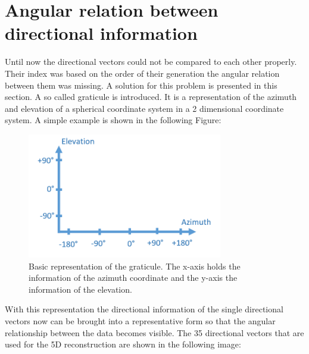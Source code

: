\section{Angular relation between directional information}
\label{angular_directional_relation}


Until now the directional vectors could not be compared to each other properly. Their index was based on the order of their generation the angular relation between them was missing. A solution for this problem is presented in this section. A so called graticule is introduced. It is a representation of the azimuth and elevation of a spherical coordinate system in a 2 dimensional coordinate system. A simple example is shown in the following Figure:

\begin{figure}[H]
    \centering
    \includegraphics[width=0.76\textwidth]{Graphics/example_gradnetz.png}
    \caption{Basic representation of the graticule. The x-axis holds the information of the azimuth coordinate and the y-axis the information of the elevation. }
    \label{fig:gadnetz_example}
\end{figure}

With this representation the directional information of the single directional vectors now can be brought into a representative form so that the angular relationship between the data becomes visible. The 35 directional vectors that are used for the 5D reconstruction are shown in the following image: 

